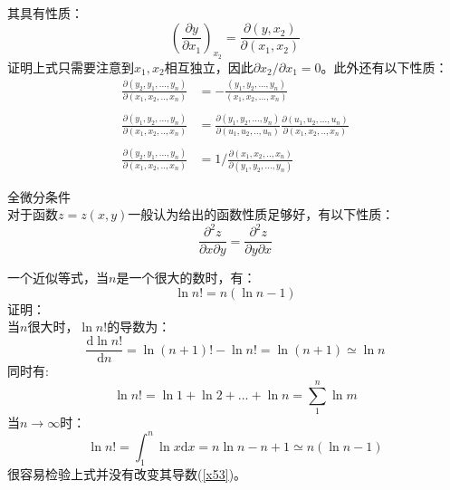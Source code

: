 \documentclass[12pt]{article}
\begin{document}
其具有性质：
\begin{equation}
	(\frac{\partial y}{\partial x_1})_{x_2}=\frac{\partial (y,x_2)}{\partial(x_1,x_2)}
\end{equation}
证明上式只需要注意到$x_1,x_2$相互独立，因此$\partial x_2/\partial x_1=0$。此外还有以下性质：
\begin{equation}
	\begin{split}
	\frac{\partial (y_2 ,y_1,...,y_n)}{\partial (x_1,x_2,..,x_n)}&=-\frac{(y_1,y_2,...,y_n)}{(x_1,x_2,...,x_n)}\\ \quad \\
	\frac{\partial (y_1 ,y_2,...,y_n)}{\partial( x_1,x_2,..,x_n)}&=\frac{\partial (y_1 ,y_2,...,y_n)}{\partial (u_1,u_2,..,u_n)}\frac{\partial (u_1 ,u_2,...,u_n)}{\partial (x_1,x_2,..,x_n)}\\ \quad \\
	\frac{\partial (y_2 ,y_1,...,y_n)}{\partial (x_1,x_2,..,x_n)}&=1/\frac{\partial (x_1,x_2,..,x_n)}{\partial (y_1 ,y_2,...,y_n)}
	\end{split}
\end{equation}
\par 全微分条件
\\对于函数$z=z(x,y)$一般认为给出的函数性质足够好，有以下性质：
\begin{equation}
	\frac{{{\partial }^{2}}z}{\partial x\partial y}=\frac{{{\partial }^{2}}z}{\partial y\partial x}
	\label{x34}
\end{equation}

一个近似等式，当$n$是一个很大的数时，有：
\begin{equation}
	\ln n!=n(\ln n-1)
\end{equation}
证明：\\
当$n$很大时，$\ln n!$的导数为：
\begin{equation}
	\frac{\mathrm{d}\ln n!}{\mathrm{d}n}=\ln (n+1)!-\ln n!=\ln (n+1)\simeq \ln n
	\label{x53}
\end{equation}
同时有:
\begin{equation}
	\ln n!=\ln 1+\ln 2+...+\ln n=\sum_{1}^{n} \ln m
\end{equation}
当$n\to \infty$时：
\begin{equation}
	\ln n!=\int_{1}^{n}\ln x\mathrm{d}x=n\ln n-n+1\simeq n(\ln n-1)
\end{equation}
很容易检验上式并没有改变其导数(\ref{x53})。
\end{document}
